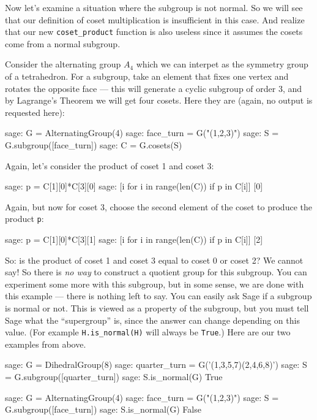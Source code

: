 %
Now let's examine a situation where the subgroup is not normal.  So we will see that our definition of coset multiplication is insufficient in this case.  And realize that our new \verb?coset_product? function is also useless since it assumes the cosets come from a normal subgroup.\par
%
Consider the alternating group $A_4$ which we can interpet as the symmetry group of a tetrahedron.  For a subgroup, take an element that fixes one vertex and rotates the opposite face --- this will generate a cyclic subgroup of order 3, and by Lagrange's Theorem we will get four cosets.  Here they are (again, no output is requested here):
%
\begin{sageexample}
sage: G = AlternatingGroup(4)
sage: face_turn = G("(1,2,3)")
sage: S = G.subgroup([face_turn])
sage: C = G.cosets(S)
\end{sageexample}
%
Again, let's consider the product of coset 1 and coset 3:
%
\begin{sageexample}
sage: p = C[1][0]*C[3][0]
sage: [i for i in range(len(C)) if p in C[i]]
[0]
\end{sageexample}
%
Again, but now for coset 3, choose the second element of the coset to produce the product \verb?p?:
%
\begin{sageexample}
sage: p = C[1][0]*C[3][1]
sage: [i for i in range(len(C)) if p in C[i]]
[2]
\end{sageexample}
%
So: is the product of coset 1 and coset 3 equal to coset 0 or coset 2?  We cannot say!  So there is \emph{no way} to construct a quotient group for this subgroup.  You can experiment some more with this subgroup, but in some sense, we are done with this example --- there is nothing left to say.
%
%
You can easily ask Sage if a subgroup is normal or not.  This is viewed as a property of the subgroup, but you must tell Sage what the ``supergroup'' is, since the answer can change depending on this value.  (For example \verb?H.is_normal(H)? will always be \verb?True?.)  Here are our two examples from above.
%
\begin{sageexample}
sage: G = DihedralGroup(8)
sage: quarter_turn = G('(1,3,5,7)(2,4,6,8)')
sage: S = G.subgroup([quarter_turn])
sage: S.is_normal(G)
True
\end{sageexample}
%
\begin{sageexample}
sage: G = AlternatingGroup(4)
sage: face_turn = G("(1,2,3)")
sage: S = G.subgroup([face_turn])
sage: S.is_normal(G)
False
\end{sageexample}
